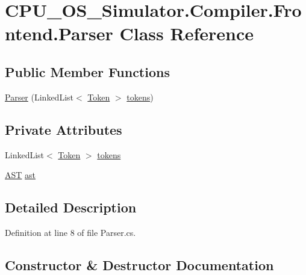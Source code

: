 \hypertarget{class_c_p_u___o_s___simulator_1_1_compiler_1_1_frontend_1_1_parser}{}\section{C\+P\+U\+\_\+\+O\+S\+\_\+\+Simulator.\+Compiler.\+Frontend.\+Parser Class Reference}
\label{class_c_p_u___o_s___simulator_1_1_compiler_1_1_frontend_1_1_parser}
\subsection*{Public Member Functions}
\begin{DoxyCompactItemize}
\item 
\hyperlink{class_c_p_u___o_s___simulator_1_1_compiler_1_1_frontend_1_1_parser_af0f1bfe1db9feba2284d5d7fc0a93d37}{Parser} (Linked\+List$<$ \hyperlink{class_c_p_u___o_s___simulator_1_1_compiler_1_1_frontend_1_1_tokens_1_1_token}{Token} $>$ \hyperlink{class_c_p_u___o_s___simulator_1_1_compiler_1_1_frontend_1_1_parser_a52ee7fdbe0d3af8e710c37ee6a149dc7}{tokens})
\end{DoxyCompactItemize}
\subsection*{Private Attributes}
\begin{DoxyCompactItemize}
\item 
Linked\+List$<$ \hyperlink{class_c_p_u___o_s___simulator_1_1_compiler_1_1_frontend_1_1_tokens_1_1_token}{Token} $>$ \hyperlink{class_c_p_u___o_s___simulator_1_1_compiler_1_1_frontend_1_1_parser_a52ee7fdbe0d3af8e710c37ee6a149dc7}{tokens}
\item 
\hyperlink{class_c_p_u___o_s___simulator_1_1_compiler_1_1_frontend_1_1_syntax_tree_1_1_a_s_t}{A\+S\+T} \hyperlink{class_c_p_u___o_s___simulator_1_1_compiler_1_1_frontend_1_1_parser_a05eafea853ea95d722ae4161e184f11a}{ast}
\end{DoxyCompactItemize}


\subsection{Detailed Description}


Definition at line 8 of file Parser.\+cs.



\subsection{Constructor \& Destructor Documentation}
\hypertarget{class_c_p_u___o_s___simulator_1_1_compiler_1_1_frontend_1_1_parser_af0f1bfe1db9feba2284d5d7fc0a93d37}{}
